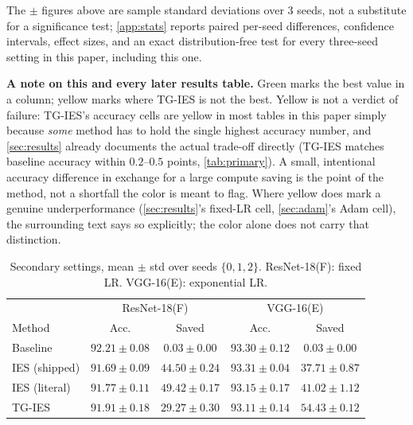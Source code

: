 \documentclass{article}
\newcommand{\win}[1]{\cellcolor{tgwin}#1}
\newcommand{\lose}[1]{\cellcolor{tglose}#1}
\theoremstyle{plain}
\theoremstyle{definition}
\theoremstyle{remark}
\begin{document}
The $\pm$ figures above are sample standard deviations over 3 seeds, not a substitute for a significance test; \cref{app:stats} reports paired per-seed differences, confidence intervals, effect sizes, and an exact distribution-free test for every three-seed setting in this paper, including this one.

\textbf{A note on this and every later results table.} \colorbox{tgwin}{Green} marks the best value in a column; \colorbox{tglose}{yellow} marks where TG-IES is not the best. Yellow is not a verdict of failure: TG-IES's accuracy cells are yellow in most tables in this paper simply because \emph{some} method has to hold the single highest accuracy number, and \cref{sec:results} already documents the actual trade-off directly (TG-IES matches baseline accuracy within $0.2$--$0.5$ points, \cref{tab:primary}). A small, intentional accuracy difference in exchange for a large compute saving is the point of the method, not a shortfall the color is meant to flag. Where yellow does mark a genuine underperformance (\cref{sec:results}'s fixed-LR cell, \cref{sec:adam}'s Adam cell), the surrounding text says so explicitly; the color alone does not carry that distinction.

\begin{table}[t]
\caption{Secondary settings, mean $\pm$ std over seeds $\{0,1,2\}$. ResNet-18(F): fixed LR. VGG-16(E): exponential LR.}
\label{tab:secondary}
\vskip 0.1in
\begin{center}
\begin{small}
\begin{tabular}{lcccc}
\toprule
& \multicolumn{2}{c}{ResNet-18(F)} & \multicolumn{2}{c}{VGG-16(E)} \\
Method & Acc. & Saved & Acc. & Saved \\
\midrule
Baseline & $92.21\pm0.08$ & $0.03\pm0.00$ & $93.30\pm0.12$ & $0.03\pm0.00$ \\
IES (shipped) & $91.69\pm0.09$ & $44.50\pm0.24$ & $93.31\pm0.04$ & $37.71\pm0.87$ \\
IES (literal) & $91.77\pm0.11$ & $\mathbf{49.42\pm0.17}$ & $93.15\pm0.17$ & $41.02\pm1.12$ \\
TG-IES & \lose{$91.91\pm0.18$} & \lose{$29.27\pm0.30$} & \lose{$93.11\pm0.14$} & \win{$\mathbf{54.43\pm0.12}$} \\
\bottomrule
\end{tabular}
\end{small}
\end{center}
\vskip -0.1in
\end{table}
\end{document}
